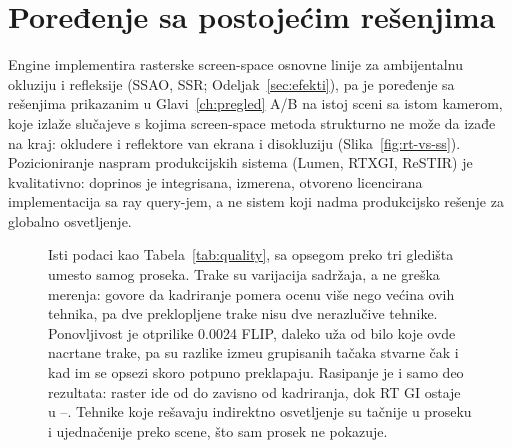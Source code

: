 \section{Poređenje sa postoje\'cim re\v{s}enjima}
\label{sec:poredjenje}

Engine implementira rasterske screen-space osnovne linije za ambijentalnu okluziju i refleksije (SSAO, SSR;
Odeljak~\ref{sec:efekti}), pa je poređenje sa re\v{s}enjima prikazanim u
Glavi~\ref{ch:pregled} A/B na istoj sceni sa istom kamerom, koje izla\v{z}e slu\v{c}ajeve s kojima screen-space metoda
strukturno ne mo\v{z}e da izađe na kraj: okludere i reflektore van ekrana i disokluziju
(Slika~\ref{fig:rt-vs-ss}). Pozicioniranje naspram produkcijskih sistema (Lumen, RTXGI, ReSTIR) je
kvalitativno: doprinos je integrisana, izmerena, otvoreno licencirana implementacija sa ray query-jem,
a ne sistem koji nadma produkcijsko re\v{s}enje za globalno osvetljenje.

\begin{table}[tbp]
\caption[Kvalitet svake tehnike naspram reference]{Kvalitet svake tehnike naspram path-traced reference (usrednjeno preko tri gledi\v{s}ta:
atrijum, pod, galerija; RX 9070 XT). Ni\v{z}i FLIP i vi\v{s}i PSNR/SSIM su bolji.}
\label{tab:quality}
\centering

\end{table}

\begin{figure}[tbp]
\centering
{}
\caption[FLIP po tehnici sa rasipanjem preko gledi\v{s}ta]{Isti podaci kao
Tabela~\ref{tab:quality}, sa opsegom preko tri gledi\v{s}ta umesto samog proseka.
Trake su varijacija sadr\v{z}aja, a ne gre\v{s}ka merenja: govore da kadriranje pomera ocenu vi\v{s}e nego
ve\'cina ovih tehnika, pa dve preklopljene trake nisu dve nerazlu\v{c}ive
tehnike. Ponovljivost je otprilike 0.0024 FLIP, daleko u\v{z}a od bilo koje ovde nacrtane trake, pa su
razlike izme\dj{}u grupisanih ta\v{c}aka stvarne \v{c}ak i kad im se opsezi skoro potpuno preklapaju.
Rasipanje je i samo deo rezultata: raster ide od \qRasterFlipLo{} do \qRasterFlipHi{}
zavisno od kadriranja, dok RT GI ostaje u \qRtGiFlipLo{}--\qRtGiFlipHi{}. Tehnike koje
re\v{s}avaju indirektno osvetljenje su ta\v{c}nije u proseku i ujedna\v{c}enije preko scene, \v{s}to
sam prosek ne pokazuje.}
\label{fig:quality-spread}
\end{figure}

